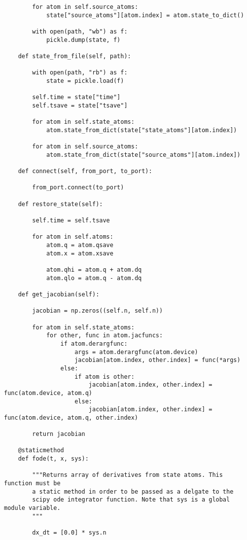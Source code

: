 \begin{lstlisting}
        for atom in self.source_atoms:
            state["source_atoms"][atom.index] = atom.state_to_dict()

        with open(path, "wb") as f:
            pickle.dump(state, f)

    def state_from_file(self, path):

        with open(path, "rb") as f:
            state = pickle.load(f)

        self.time = state["time"] 
        self.tsave = state["tsave"]

        for atom in self.state_atoms:
            atom.state_from_dict(state["state_atoms"][atom.index])

        for atom in self.source_atoms:
            atom.state_from_dict(state["source_atoms"][atom.index])

    def connect(self, from_port, to_port):

        from_port.connect(to_port)

    def restore_state(self):

        self.time = self.tsave

        for atom in self.atoms:
            atom.q = atom.qsave
            atom.x = atom.xsave

            atom.qhi = atom.q + atom.dq
            atom.qlo = atom.q - atom.dq

    def get_jacobian(self):

        jacobian = np.zeros((self.n, self.n))

        for atom in self.state_atoms:
            for other, func in atom.jacfuncs:
                if atom.derargfunc:
                    args = atom.derargfunc(atom.device)
                    jacobian[atom.index, other.index] = func(*args)
                else:
                    if atom is other:
                        jacobian[atom.index, other.index] = func(atom.device, atom.q)
                    else:
                        jacobian[atom.index, other.index] = func(atom.device, atom.q, other.index)

        return jacobian

    @staticmethod
    def fode(t, x, sys):

        """Returns array of derivatives from state atoms. This function must be
        a static method in order to be passed as a delgate to the
        scipy ode integrator function. Note that sys is a global module variable.
        """

        dx_dt = [0.0] * sys.n


\end{lstlisting}
